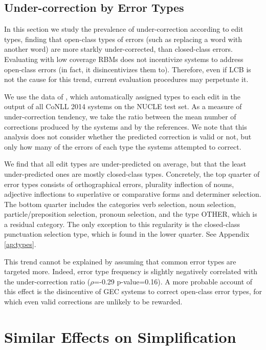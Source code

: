 \documentclass[11pt, a4paper]{article}
\begin{document}
\subsection{Under-correction by Error Types}\label{subsec:by_types}

In this section we study the prevalence of under-correction according to edit types, finding that open-class types of errors
(such as replacing a word with another word) are more starkly under-corrected, than closed-class errors.
Evaluating with low coverage RBMs does not incentivize systems to address open-class errors (in fact, it disincentivizes them to). Therefore, even if LCB is not the cause for this trend, current evaluation procedures may perpetuate it.

We use the data of \citet{bryant-felice-briscoe:2017:Long}, which automatically assigned types to each edit 
in the output of all CoNLL 2014 systems on the NUCLE test set.
As a measure of under-correction tendency, we take the ratio between the mean number of corrections produced by the systems and by the references.
We note that this analysis does not consider whether the predicted correction is valid or not, but only how many of the errors of each type the systems attempted to correct. 

We find that all edit types are under-predicted on average, but that the least under-predicted ones are mostly closed-class types. 
Concretely, the top quarter of error types consists of orthographical errors, 
plurality inflection of nouns, 
adjective inflections to superlative or comparative forms and determiner selection. The bottom quarter includes the categories 
verb selection, noun selection, particle/preposition selection, pronoun selection, and the type {\sc OTHER}, which is a residual category.
The only exception to this regularity is the closed-class punctuation selection type, which is found in the lower quarter. See Appendix \ref{ap:types}.

This trend cannot be explained by assuming that common error types are targeted more.
Indeed, error type frequency is slightly negatively correlated with the under-correction ratio ($\rho$=-0.29 p-value=0.16).
A more probable account of this effect is the disincentive of GEC systems to correct open-class error types, for which even valid
corrections are unlikely to be rewarded.

\section{Similar Effects on Simplification}\label{sec:simplification}
\end{document}
